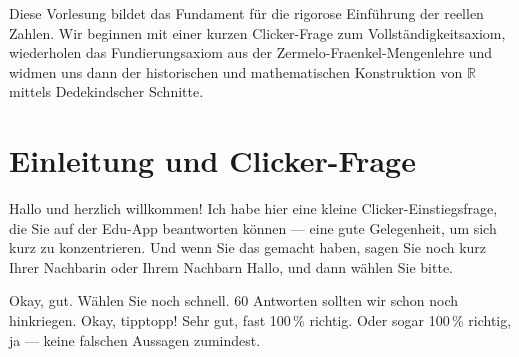 

\begin{nice-box}[Vorlesungsübersicht]
Diese Vorlesung bildet das Fundament für die rigorose Einführung der reellen Zahlen. Wir beginnen mit einer kurzen Clicker-Frage zum Vollständigkeitsaxiom, wiederholen das Fundierungsaxiom aus der Zermelo-Fraenkel-Mengenlehre und widmen uns dann der historischen und mathematischen Konstruktion von $\mathbb{R}$ mittels Dedekindscher Schnitte.
\end{nice-box}

\section{Einleitung und Clicker-Frage}

\begin{spoken-clean}[00:00:00 - 00:01:43]
Hallo und herzlich willkommen! Ich habe hier eine kleine Clicker-Einstiegsfrage, die Sie auf der Edu-App beantworten können --- eine gute Gelegenheit, um sich kurz zu konzentrieren. Und wenn Sie das gemacht haben, sagen Sie noch kurz Ihrer Nachbarin oder Ihrem Nachbarn Hallo, und dann wählen Sie bitte.

Okay, gut. Wählen Sie noch schnell. 60 Antworten sollten wir schon noch hinkriegen. Okay, tipptopp! Sehr gut, fast 100\,\% richtig. Oder sogar 100\,\% richtig, ja --- keine falschen Aussagen zumindest.
\end{spoken-clean}

